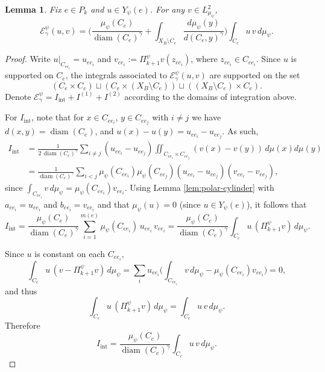 \documentclass[10pt,a4paper]{amsart}
\newtheorem{lemma}{Lemma}
\begin{document}
\begin{lemma}
\label{lem:diag-cylinder}
Fix $e\in P_k$ and $u\in Y_\psi(e)$. For any $v\in L^2_{\mu_\psi}$,
\begin{equation}
\label{eq:diag-cylinder}
\mathcal{E}^\psi_\gamma(u,v)
=
\Bigg(\frac{\mu_\psi(C_e)}{\operatorname{diam}(C_e)^\gamma}
+\int_{X_B\setminus C_e}\frac{d\mu_\psi(y)}{d(C_e,y)^\gamma}\Bigg)\int_{C_e} u\,v\,d\mu_\psi.
\end{equation}
\end{lemma}

\begin{proof}
Write $u|_{C_{ee_i}}=u_{ee_i}$ and $v_{ee_i}:=\Pi^\psi_{k+1}v(z_{ee_i})$, where $z_{ee_i}\in C_{ee_i}$. Since $u$ is supported on $C_e$, the integrals associated to $\mathcal{E}^\psi_\gamma (u,v)$ are supported on the set 
$$(C_e\times C_e)\sqcup (C_e\times(X_B\setminus C_e) ) \sqcup ((X_B\setminus C_e)\times C_e).$$
Denote $\mathcal{E}^\psi_\gamma  = I_{\mathrm{int}}+I^{(1)}+I^{(2)}$ according to the domains of integration above.

For $I_{\mathrm{int}}$, note that for $x\in C_{ee_i}$, $y\in C_{ee_j}$ with $i\neq j$ we have $d(x,y)=\operatorname{diam}(C_e)$,
and $u(x)-u(y)=u_{ee_i}-u_{ee_j}$. As such,
\begin{align*}
I_{\mathrm{int}}
&=\frac{1}{2\,\operatorname{diam}(C_e)^\gamma}
\sum_{i\neq j}(u_{ee_i}-u_{ee_j})\!\!\iint_{C_{ee_i}\times C_{ee_j}}\!\!(v(x)-v(y))\,d\mu(x)d\mu(y) \\
&=\frac{1}{\operatorname{diam}(C_e)^\gamma}\sum_{i<j}\mu_\psi(C_{ee_i})\mu_\psi(C_{ee_j})(u_{ee_i}-u_{ee_j})(v_{ee_i}-v_{ee_j}),
\end{align*}
since $\int_{C_{ee_i}}v\,d\mu_\psi=\mu_\psi(C_{ee_i})v_{ee_i}$. Using Lemma \ref{lem:polar-cylinder} with
$a_{ee_i}=u_{ee_i}$ and $b_{ee_i}=v_{ee_i}$ and that $\mu_\psi(u)=0$ (since $u\in Y_\psi(e)$), it follows that
\[
I_{\mathrm{int}}
=\frac{\mu_\psi(C_e)}{\operatorname{diam}(C_e)^\gamma}\sum_{i=1}^{m(e)} \mu_\psi(C_{ee_i})\,u_{ee_i}\,v_{ee_i}
=\frac{\mu_\psi(C_e)}{\operatorname{diam}(C_e)^\gamma}\int_{C_e} u\,(\Pi^\psi_{k+1}v)\,d\mu_\psi.
\]

Since $u$ is constant on each $C_{ee_i}$,
\[
\int_{C_e} u\,(v-\Pi^\psi_{k+1}v)\,d\mu_\psi
=\sum_i u_{ee_i}\Big(\int_{C_{ee_i}} v\,d\mu_\psi-\mu_\psi(C_{ee_i})v_{ee_i}\Big)=0,
\]
and thus
\begin{equation}\label{eq:replace-v-by-avg}
\int_{C_e} u\,(\Pi^\psi_{k+1}v)\,d\mu_\psi=\int_{C_e} u\,v\,d\mu_\psi.
\end{equation}
Therefore
\[
I_{\mathrm{int}}=\frac{\mu_\psi(C_e)}{\operatorname{diam}(C_e)^\gamma}\int_{C_e} u\,v\,d\mu_\psi.
\]


\end{proof}
\end{document}

